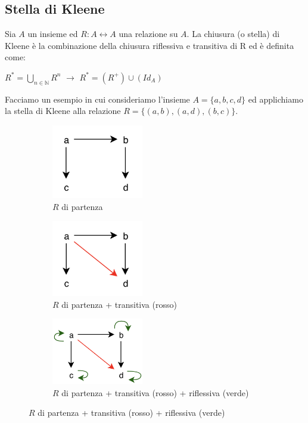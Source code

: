\subsection{Stella di Kleene}
\begin{definition}
    Sia $A$ un insieme ed $R: A \leftrightarrow A$ una relazione su $A$. La chiusura (o stella) di Kleene è la combinazione della chiusura riflessiva e transitiva di R ed è definita come:
    \begin{center}
         $R^\ast = \bigcup\limits_{n \in \mathbb{N}} R^n$ $\longrightarrow$ $R^\ast = (R^+) \cup (Id_A)$
    \end{center}
\end{definition}
\begin{example}
Facciamo un esempio in cui consideriamo l'insieme $A = \{a,b,c,d\}$ ed applichiamo la stella di Kleene alla relazione $R = \{(a,b),(a,d),(b,c)\}$.
\end{example}
\begin{figure}[h!]
    \vspace{-20pt}
    \begin{subfigure}{.3\textwidth}
        \centering
        \includegraphics[width=4cm]{images/stella-Kleene-1.png}
        \caption{$R$ di partenza}
    \end{subfigure}
    \hfill
    \begin{subfigure}{.3\textwidth}
        \centering
        \includegraphics[width=4cm]{images/stella-Kleene-2.png}
        \caption{$R$ di partenza + transitiva (rosso)}
    \end{subfigure}
    \hfill
    \begin{subfigure}{.3\textwidth}
        \centering
        \includegraphics[width=4cm]{images/stella-Kleene-3.png}
        \caption{$R$ di partenza + transitiva (rosso) + riflessiva (verde)}
    \end{subfigure}
\end{figure}


